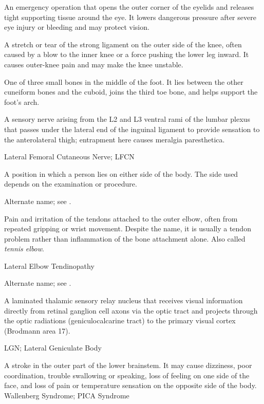 An emergency operation that opens the outer corner of the eyelids and releases tight supporting tissue around the eye. It lowers dangerous pressure after severe eye injury or bleeding and may protect vision.

 A stretch or tear of the strong ligament on the outer side of the knee, often caused by a blow to the inner knee or a force pushing the lower leg inward. It causes outer-knee pain and may make the knee unstable.

 One of three small bones in the middle of the foot. It lies between the other cuneiform bones and the cuboid, joins the third toe bone, and helps support the foot’s arch.

 A sensory nerve arising from the L2 and L3 ventral rami of the lumbar plexus that passes under the lateral end of the inguinal ligament to provide sensation to the anterolateral thigh; entrapment here causes meralgia paresthetica.

\synonyms
Lateral Femoral Cutaneous Nerve; LFCN

 A position in which a person lies on either side of the body. The side used depends on the examination or procedure.

 Alternate name; see .

 Pain and irritation of the tendons attached to the outer elbow, often from repeated gripping or wrist movement. Despite the name, it is usually a tendon problem rather than inflammation of the bone attachment alone. Also called \textit{tennis elbow}.

\synonyms
Lateral Elbow Tendinopathy

 Alternate name; see .

 A laminated thalamic sensory relay nucleus that receives visual information directly from retinal ganglion cell axons via the optic tract and projects through the optic radiations (geniculocalcarine tract) to the primary visual cortex (Brodmann area 17).

\synonyms
LGN; Lateral Geniculate Body

 A stroke in the outer part of the lower brainstem. It may cause dizziness, poor coordination, trouble swallowing or speaking, loss of feeling on one side of the face, and loss of pain or temperature sensation on the opposite side of the body.
\synonyms
Wallenberg Syndrome; PICA Syndrome

